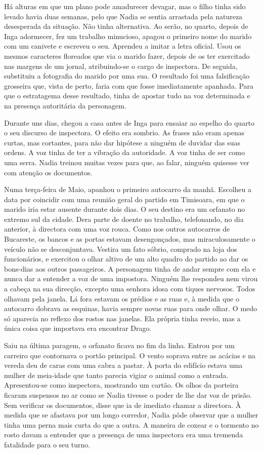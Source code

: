 Há alturas em que um plano pode amadurecer devagar, mas o filho tinha
sido levado havia duas semanas, pelo que Nadia se sentia arrastada pela
natureza desesperada da situação. Não tinha alternativa. Ao serão, no
quarto, depois de Inga adormecer, fez um trabalho minucioso, apagou o
primeiro nome do marido com um canivete e escreveu o seu. Aprendeu a
imitar a letra oficial. Usou os mesmos caracteres floreados que via o
marido fazer, depois de os ter exercitado nas margens de um jornal,
atribuindo-se o cargo de inspectora. De seguida, substituiu a fotografia do
marido por uma sua. O resultado foi uma falsificação grosseira que,
vista de perto, faria com que fosse imediatamente apanhada. Para que o
estratagema desse resultado, tinha de apostar tudo na voz determinada e
na presença autoritária da personagem.

Durante uns dias, chegou a casa antes de Inga para ensaiar ao espelho do
quarto o seu discurso de inspectora. O efeito era sombrio. As frases não
eram apenas curtas, mas cortantes, para não dar hipótese a ninguém de
duvidar das suas ordens. A voz tinha de ter a vibração da autoridade.
A voz tinha de ser como uma serra. Nadia treinou muitas vezes para que,
ao falar, ninguém quisesse ver com atenção os documentos.

Numa terça-feira de Maio, apanhou o primeiro autocarro da manhã.
Escolheu a data por coincidir com uma reunião geral do partido em
Timisoara, em que o marido iria estar ausente durante dois dias. O seu
destino era um orfanato no extremo sul da cidade. Dera parte de doente
no
trabalho, telefonando, no dia anterior, à directora com uma voz rouca.
Como nos outros autocarros de Bucareste, os bancos e as portas estavam
desengonçados, mas miraculosamente o veículo não se desconjuntava.
Vestira um fato sóbrio, comprado na loja dos funcionários, e exercitou o
olhar altivo de um alto quadro do partido ao dar os bons-dias aos outros passageiros. A personagem tinha de andar sempre com ela
e nunca dar a entender a voz de uma impostora. Ninguém lhe respondeu
nem virou a cabeça na sua direcção, excepto uma senhora idosa com tiques
nervosos. Todos olhavam pela janela. Lá fora estavam os prédios e as
ruas e, à medida que o autocarro dobrava as esquinas, havia sempre novas
ruas para onde olhar. O medo só aparecia no reflexo dos rostos nas
janelas. Ela própria tinha receio, mas a única coisa que importava era
encontrar Drago.

Saiu na última paragem, o orfanato ficava no fim da linha. Entrou por um
carreiro que contornava o portão principal. O vento soprava entre as
acácias e na vereda deu de caras com uma cabra a pastar. À porta do
edifício estava uma mulher de meia-idade que tanto parecia vigiar o
animal como a entrada. Apresentou-se como inspectora, mostrando um
cartão. Os olhos da porteira ficaram suspensos no ar como se Nadia
tivesse o poder de lhe dar voz de prisão. Sem verificar os documentos,
disse que ia de imediato chamar a directora. À medida que se afastava
por um longo corredor, Nadia pôde observar que a mulher tinha uma perna
mais curta do que a outra. A maneira de coxear e o tormento no rosto
davam a entender que a presença de uma inspectora era uma tremenda
fatalidade para o seu turno.


